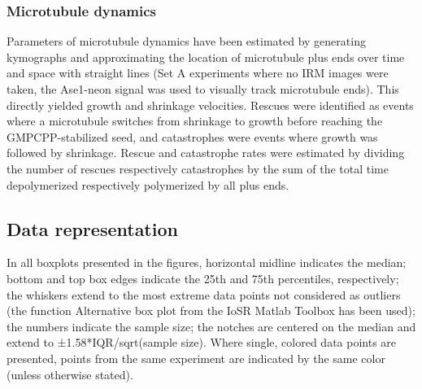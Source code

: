 \subsubsection{Microtubule dynamics}
Parameters of microtubule dynamics have been estimated by generating kymographs and approximating the location of microtubule plus ends over time and space with straight lines (Set A experiments where no IRM images were taken, the Ase1-neon signal was used to visually track microtubule ends). This directly yielded growth and shrinkage velocities. Rescues were identified as events where a microtubule switches from shrinkage to growth before reaching the GMPCPP-stabilized seed, and catastrophes were events where growth was followed by shrinkage. Rescue and catastrophe rates were estimated by dividing the number of rescues respectively catastrophes by the sum of the total time depolymerized respectively polymerized by all plus ends.

\subsection{Data representation}
In all boxplots presented in the figures, horizontal midline indicates the median; bottom and top box edges indicate the 25th and 75th percentiles, respectively; the whiskers extend to the most extreme data points not considered as outliers (the function Alternative box plot from the IoSR Matlab Toolbox has been used); the numbers indicate the sample size; the notches are centered on the median and extend to ±1.58*IQR/sqrt(sample size). Where single, colored data points are presented, points from the same experiment are indicated by the same color (unless otherwise stated). 